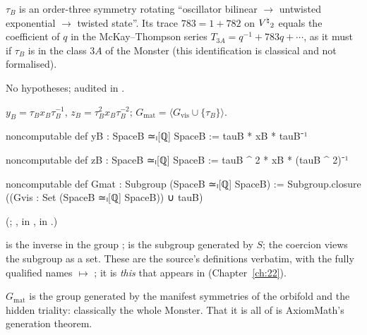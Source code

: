 \begin{physics}
$\tau_B$ is an order-three symmetry rotating ``oscillator bilinear $\to$ untwisted exponential $\to$
twisted state''.  Its trace $783=1+782$ on ${V^{\natural}}_2$ equals the coefficient of $q$ in the
McKay--Thompson series $T_{3A}=q^{-1}+783q+\cdots$, as it must if $\tau_B$ is in the class $3A$ of
the Monster (this identification is classical and not formalised).
\end{physics}
\begin{status}
No hypotheses; audited in .
\end{status}

\begin{definition}\label{ch21:def:Gmat}
$y_B=\tau_Bx_B\tau_B^{-1}$, $z_B=\tau_B^2x_B\tau_B^{-2}$;
$G_{\mathrm{mat}}=\langle G_{\mathrm{vis}}\cup\{\tau_B\}\rangle$.
\end{definition}
\begin{leancode}
noncomputable def yB : SpaceB ≃ₗ[ℚ] SpaceB := tauB * xB * tauB⁻¹
\end{leancode}
\begin{leancode}
noncomputable def zB : SpaceB ≃ₗ[ℚ] SpaceB := tauB ^ 2 * xB * (tauB ^ 2)⁻¹
\end{leancode}
\begin{leancode}
noncomputable def Gmat : Subgroup (SpaceB ≃ₗ[ℚ] SpaceB) :=
  Subgroup.closure ((Gvis : Set (SpaceB ≃ₗ[ℚ] SpaceB)) ∪ {tauB})
\end{leancode}
(; ,  in
,  in .)
\begin{dictionary}
 is the inverse in the group ;  is the
subgroup generated by $S$; the coercion  views the subgroup as a set.  These are the
source's definitions verbatim, with the fully qualified names
 $\mapsto$ ; it is
\emph{this}  that appears in  (Chapter~\ref{ch:22}).
\end{dictionary}
\begin{physics}
$G_{\mathrm{mat}}$ is the group generated by the manifest symmetries of the orbifold and the hidden
triality: classically the whole Monster.  That it is all of  is AxiomMath's generation theorem.
\end{physics}

